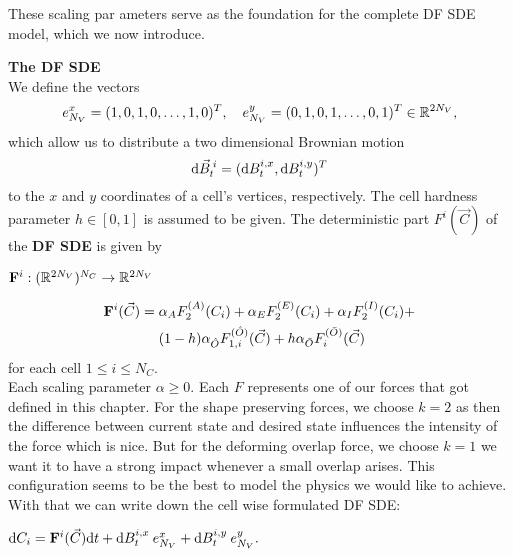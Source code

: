 These scaling par
ameters serve as the foundation for the complete DF SDE model, which we now introduce.
\begin{definition} \textbf{The DF SDE} \\
	We define the vectors
	\[
	e_{N_V}^{x} = (1,0,1,0,\ldots,1,0)^T, \quad e_{N_V}^{y} = (0,1,0,1,\ldots,0,1)^T \in \mathbb{R}^{2N_V},
	\]
	which allow us to distribute a two dimensional Brownian motion \[\mathrm{d} \vec{B}^{\:i}_t = (\mathrm{d} B^{i,x}_t, \mathrm{d} B^{i,y}_t)^T\] to the $x$ and $y$ coordinates of a cell's vertices, respectively.
	The cell hardness parameter $h \in [0,1]$ is assumed to be given.
	The deterministic part $F^{i}(\vec{C})$ of the \textbf{DF SDE} is given by 
	\begin{center}
		$ \mathbf{F}^i: (\mathbb{R}^{2N_V})^{N_C} \rightarrow \mathbb{R}^{2N_V} $
	\end{center}
	\begin{align}
		\begin{split}
			\mathbf{F}^{i}(\vec{C}) = \; & \alpha_{A} F_2^{(A)}(C_i) + \alpha_{E} F_2^{(E)}(C_i) + \alpha_{I} F_2^{(I)}(C_i) + \\
			& (1-h)\alpha_{\hat{O}} F_{1,i}^{(\hat{O})}(\vec{C}) + h \alpha_{\bar{O}} F_i^{(\bar{O})}(\vec{C})
		\end{split}
	\end{align}
	for each cell $1 \leq i \leq N_C$. \\ 
	Each scaling parameter $\alpha \geq 0$. 
	Each $F$ represents one of our forces that got defined in this chapter. 
	For the shape preserving forces, we choose $k=2$ as then the difference between current state and desired state influences the intensity of the force which is nice.
	But for the deforming overlap force, we choose $k=1$ we want it to have a strong impact whenever a small overlap arises. 
	This configuration seems to be the best to model the physics we would like to achieve. 
	With that we can write down the cell wise formulated DF SDE:
	\begin{center}
		$\mathrm{d} C_i = \mathbf{F}^{i}(\vec{C}) \mathrm{d} t + \mathrm{d} B^{i,x}_t \: e_{N_V}^{x} + \mathrm{d} B^{i,y}_t \: e_{N_V}^{y}.$
	\end{center} 


\end{definition}

